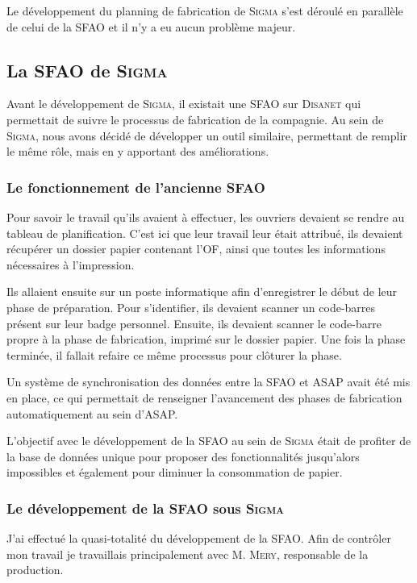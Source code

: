 Le développement du planning de fabrication de \textsc{Sigma} s'est déroulé en parallèle de celui de la SFAO et il n'y a eu aucun problème majeur.

\newpage
\subsection{La SFAO de \textsc{Sigma}}

Avant le développement de \textsc{Sigma}, il existait une SFAO sur \textsc{Disanet} qui permettait de suivre le processus de fabrication de la compagnie.
Au sein de \textsc{Sigma}, nous avons décidé de développer un outil similaire, permettant de remplir le même rôle, mais en y apportant des améliorations.

\subsubsection{Le fonctionnement de l'ancienne SFAO}

Pour savoir le travail qu'ils avaient à effectuer, les ouvriers devaient se rendre au tableau de planification.
C'est ici que leur travail leur était attribué, ils devaient récupérer un dossier papier contenant l'OF, ainsi que toutes les informations nécessaires à l'impression.

Ils allaient ensuite sur un poste informatique afin d'enregistrer le début de leur phase de préparation.
Pour s'identifier, ils devaient scanner un code-barres présent sur leur badge personnel.
Ensuite, ils devaient scanner le code-barre propre à la phase de fabrication, imprimé sur le dossier papier.
Une fois la phase terminée, il fallait refaire ce même processus pour clôturer la phase.

Un système de synchronisation des données entre la SFAO et ASAP avait été mis en place, ce qui permettait de renseigner l'avancement des phases de fabrication automatiquement au sein d'ASAP.

L'objectif avec le développement de la SFAO au sein de \textsc{Sigma} était de profiter de la base de données unique pour proposer des fonctionnalités jusqu'alors impossibles et également pour diminuer la consommation de papier.

\subsubsection{Le développement de la SFAO sous \textsc{Sigma}}

J'ai effectué la quasi-totalité du développement de la SFAO.
Afin de contrôler mon travail je travaillais principalement avec M. \textsc{Mery}, responsable de la production.

